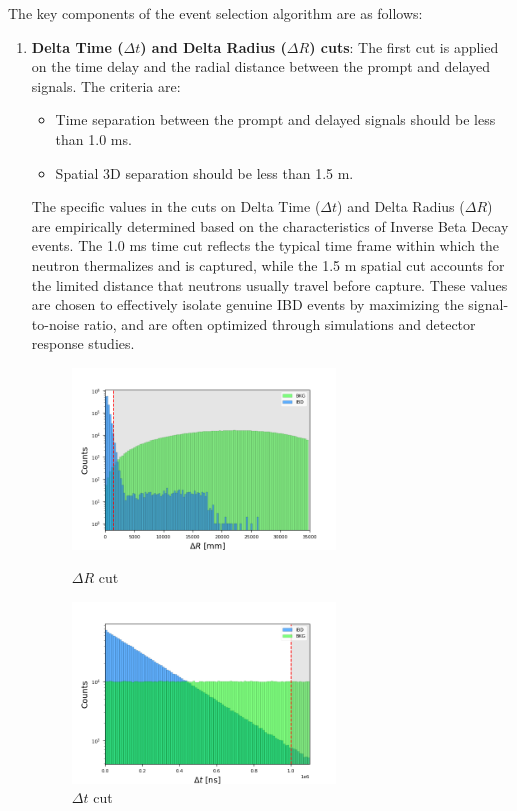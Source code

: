 The key components of the event selection algorithm are as follows:

\begin{enumerate}
	\item \textbf{Delta Time ($\Delta t$) and Delta Radius ($\Delta R$) cuts}: The first cut is applied on the time delay and the radial distance between the prompt and delayed signals. The criteria are:
	\begin{itemize}
		\item Time separation between the prompt and delayed signals should be less than 1.0 ms.
		\item Spatial 3D separation should be less than 1.5 m.
	\end{itemize}

	The specific values in the cuts on Delta Time ($\Delta t$) and Delta Radius ($\Delta R$) are empirically determined based on the characteristics of Inverse Beta Decay events. The 1.0 ms time cut reflects the typical time frame within which the neutron thermalizes and is captured, while the 1.5 m spatial cut accounts for the limited distance that neutrons usually travel before capture. These values are chosen to effectively isolate genuine IBD events by maximizing the signal-to-noise ratio, and are often optimized through simulations and detector response studies.
	
	\vspace{-1\baselineskip}

\begin{figure}[h!]
	\centering
	\begin{minipage}{0.5\textwidth}
		\centering
		\includegraphics[width=7cm]{Images/Cut/delta_radius.png}
		\caption{$\Delta R$ cut}
		\label{fig:delta_radius_cut}
	\end{minipage}%
	\begin{minipage}{0.5\textwidth}
		\centering
		\includegraphics[width=7cm]{Images/Cut/delta_time.png}
		\caption{$\Delta t$ cut}
		\label{fig:delta_t_cut}
	\end{minipage}
\end{figure}



\end{enumerate}

